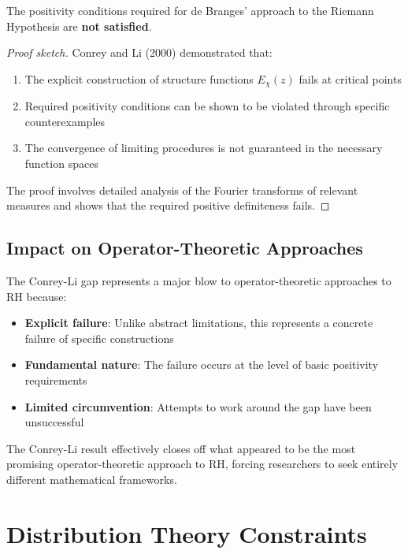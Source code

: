 \begin{theorem}
\label{thm:conrey_li_gap}
The positivity conditions required for de Branges' approach to the Riemann Hypothesis are \textbf{not satisfied}.
\end{theorem}

\begin{proof}[Proof sketch]
Conrey and Li (2000) demonstrated that:
\begin{enumerate}
\item The explicit construction of structure functions $E_\chi(z)$ fails at critical points
\item Required positivity conditions can be shown to be violated through specific counterexamples
\item The convergence of limiting procedures is not guaranteed in the necessary function spaces
\end{enumerate}

The proof involves detailed analysis of the Fourier transforms of relevant measures and shows that the required positive definiteness fails.
\end{proof}

\subsection{Impact on Operator-Theoretic Approaches}

The Conrey-Li gap represents a major blow to operator-theoretic approaches to RH because:

\begin{itemize}
\item \textbf{Explicit failure}: Unlike abstract limitations, this represents a concrete failure of specific constructions
\item \textbf{Fundamental nature}: The failure occurs at the level of basic positivity requirements
\item \textbf{Limited circumvention}: Attempts to work around the gap have been unsuccessful
\end{itemize}

\begin{remark}
The Conrey-Li result effectively closes off what appeared to be the most promising operator-theoretic approach to RH, forcing researchers to seek entirely different mathematical frameworks.
\end{remark}

\section{Distribution Theory Constraints}
\label{sec:distribution_constraints}

